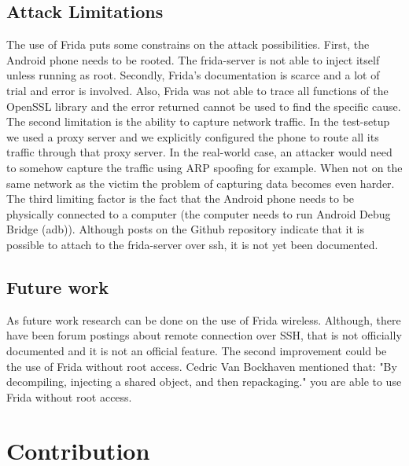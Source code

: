 \documentclass[12pt, a4paper]{report}
\begin{document}
\section{Attack Limitations}
The use of Frida puts some constrains on the attack possibilities. First, the Android phone needs to be rooted. The frida-server is not able to inject itself unless running as root. Secondly, Frida's documentation is scarce and a lot of trial and error is involved. Also, Frida was not able to trace all functions of the OpenSSL library and the error returned cannot be used to find the specific cause.  
\newline
\newline
The second limitation is the ability to capture network traffic. In the test-setup we used a proxy server and we explicitly configured the phone to route all its traffic through that proxy server. In the real-world case, an attacker would need to somehow capture the traffic using ARP spoofing for example. When not on the same network as the victim the problem of capturing data becomes even harder. 
\newline
\newline
The third limiting factor is the fact that the Android phone needs to be physically connected to a computer (the computer needs to run Android Debug Bridge (adb)). Although posts on the Github repository indicate that it is possible to attach to the frida-server over ssh, it is not yet been documented.   


\section{Future work}

As future work research can be done on the use of Frida wireless. Although, there have been forum postings about remote connection over SSH, that is not officially documented and it is not an official feature.
\newline
\newline
The second improvement could be the use of Frida without root access. Cedric Van Bockhaven mentioned that: "By decompiling, injecting a shared object, and then repackaging." you are able to use Frida without root access.

\chapter{Contribution} 



\end{document}
